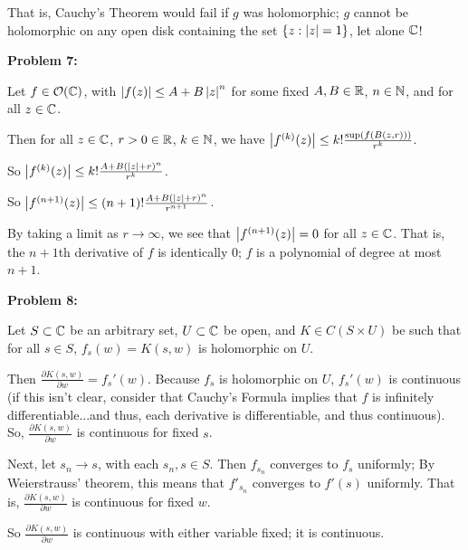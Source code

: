\documentclass[a4paper,12pt]{article}
\begin{document}
That is, Cauchy's Theorem would fail if $g$ was holomorphic; $g$ cannot be holomorphic on any open disk containing the set $\{z: \left\lvert z \right\rvert = 1\}$, let alone $\mathbb{C}$!

\shunt

{\bf Problem 7:}

Let $f \in \mathcal{O}( \mathbb{C})$, with $\left\lvert f(z) \right\rvert \leq A + B\left\lvert z \right\rvert^n$ for some fixed $A, B \in \mathbb{R}$, $n \in \mathbb{N}$, and for all $z \in \mathbb{C}$.

Then for all $z \in \mathbb{C}$, $r>0 \in \mathbb{R}$, $k \in \mathbb{N}$, we have $\left\lvert f^{(k)}(z) \right\rvert \leq k! \frac{\sup(f(B(z,r)))}{r^k}$.

So $\left\lvert f^{(k)}(z) \right\rvert \leq k! \frac{A+B(\left\lvert z \right\rvert+r)^n}{r^k}$.

So $\left\lvert f^{(n+1)}(z) \right\rvert \leq (n+1)! \frac{A+B(\left\lvert z \right\rvert+r)^n}{r^{n+1}}$.

By taking a limit as $r \to \infty$, we see that $\left\lvert f^{(n+1)}(z) \right\rvert=0$ for all $z \in \mathbb{C}$. That is, the $n+1$th derivative of $f$ is identically $0$; $f$ is a polynomial of degree at most $n+1$.

\shunt

{\bf Problem 8:}

Let $S \subset \mathbb{C}$ be an arbitrary set, $U \subset \mathbb{C}$ be open, and $K \in C(S \times U)$ be such that for all $s \in S$, $f_s(w) = K(s,w)$ is holomorphic on $U$.

Then $\frac{\partial K(s,w)}{\partial w} = f_s'(w)$. Because $f_s$ is holomorphic on $U$, $f_s'(w)$ is continuous (if this isn't clear, consider that Cauchy's Formula implies that $f$ is infinitely differentiable...and thus, each derivative is differentiable, and thus continuous). So, $\frac{\partial K(s,w)}{\partial w}$ is continuous for fixed $s$.

Next, let $s_n \to s$, with each $s_n, s \in S$. Then $f_{s_n}$ converges to $f_s$ uniformly; %
By Weierstrauss' theorem, this means that $f'_{s_n}$ converges to $f'(s)$ uniformly. That is, $\frac{\partial K(s,w)}{\partial w}$ is continuous for fixed $w$.

So $\frac{\partial K(s,w)}{\partial w}$ is continuous with either variable fixed; it is continuous.

\shunt
\end{document}
